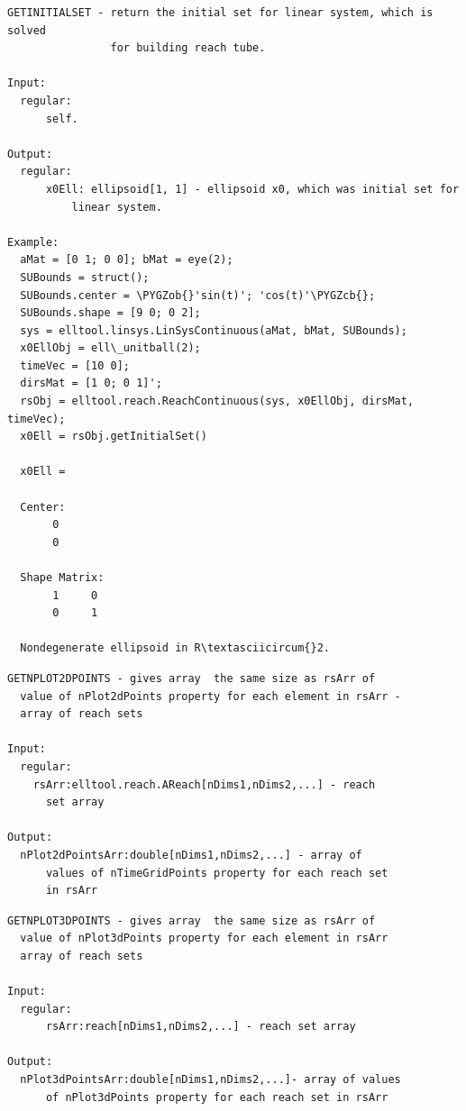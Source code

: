 \documentclass[letterpaper,10pt,english]{sphinxmanual}
\def\PYGZob{\char`\{}
\def\PYGZcb{\char`\}}
\begin{document}
\begin{Verbatim}[commandchars=\\\{\}]
GETINITIALSET - return the initial set for linear system, which is solved
                for building reach tube.

Input:
  regular:
      self.

Output:
  regular:
      x0Ell: ellipsoid[1, 1] - ellipsoid x0, which was initial set for
          linear system.

Example:
  aMat = [0 1; 0 0]; bMat = eye(2);
  SUBounds = struct();
  SUBounds.center = \PYGZob{}'sin(t)'; 'cos(t)'\PYGZcb{};
  SUBounds.shape = [9 0; 0 2];
  sys = elltool.linsys.LinSysContinuous(aMat, bMat, SUBounds);
  x0EllObj = ell\_unitball(2);
  timeVec = [10 0];
  dirsMat = [1 0; 0 1]';
  rsObj = elltool.reach.ReachContinuous(sys, x0EllObj, dirsMat, timeVec);
  x0Ell = rsObj.getInitialSet()

  x0Ell =

  Center:
       0
       0

  Shape Matrix:
       1     0
       0     1

  Nondegenerate ellipsoid in R\textasciicircum{}2.
\end{Verbatim}

\begin{Verbatim}[commandchars=\\\{\}]
GETNPLOT2DPOINTS - gives array  the same size as rsArr of
  value of nPlot2dPoints property for each element in rsArr -
  array of reach sets

Input:
  regular:
    rsArr:elltool.reach.AReach[nDims1,nDims2,...] - reach
      set array

Output:
  nPlot2dPointsArr:double[nDims1,nDims2,...] - array of
      values of nTimeGridPoints property for each reach set
      in rsArr
\end{Verbatim}

\begin{Verbatim}[commandchars=\\\{\}]
GETNPLOT3DPOINTS - gives array  the same size as rsArr of
  value of nPlot3dPoints property for each element in rsArr
  array of reach sets

Input:
  regular:
      rsArr:reach[nDims1,nDims2,...] - reach set array

Output:
  nPlot3dPointsArr:double[nDims1,nDims2,...]- array of values
      of nPlot3dPoints property for each reach set in rsArr
\end{Verbatim}
\end{document}
